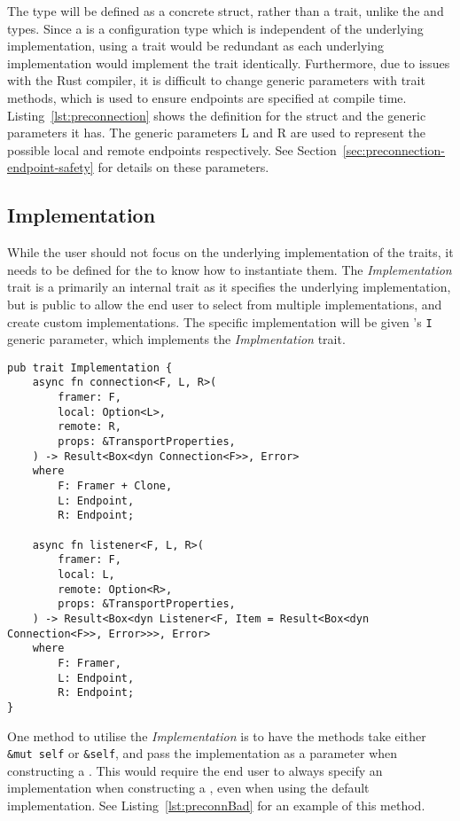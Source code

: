 The \preconnection{} type will be defined as a concrete struct, rather than a trait, unlike the \listener{} and
\connection{} types.
Since a \preconnection{} is a configuration type which is independent of the underlying implementation, using a
trait would be redundant as each underlying implementation would implement the trait identically.
Furthermore, due to issues with the Rust compiler, it is difficult to change generic parameters with trait methods,
which is used to ensure endpoints are specified at compile time.
Listing~\ref{lst:preconnection} shows the definition for the \preconnection{} struct and the generic parameters it
has.
The generic parameters L and R are used to represent the possible local and remote endpoints respectively.
See Section~\ref{sec:preconnection-endpoint-safety} for details on these parameters.

\subsection{Implementation}\label{subsec:implementation}
While the user should not focus on the underlying implementation of the traits, it needs to be defined for the
\preconnection{} to know how to instantiate them.
The \emph{Implementation} trait is a primarily an internal trait as it specifies the underlying implementation, but is
public to allow the end user to select from multiple implementations, and create custom implementations.
The specific implementation will be given \preconnection{}'s \texttt{I} generic parameter, which implements the
\emph{Implmentation} trait.

\begin{lstlisting}[float=h, label=lst:impl, caption={The Implementation trait.}]
pub trait Implementation {
    async fn connection<F, L, R>(
        framer: F,
        local: Option<L>,
        remote: R,
        props: &TransportProperties,
    ) -> Result<Box<dyn Connection<F>>, Error>
    where
        F: Framer + Clone,
        L: Endpoint,
        R: Endpoint;

    async fn listener<F, L, R>(
        framer: F,
        local: L,
        remote: Option<R>,
        props: &TransportProperties,
    ) -> Result<Box<dyn Listener<F, Item = Result<Box<dyn Connection<F>>, Error>>>, Error>
    where
        F: Framer,
        L: Endpoint,
        R: Endpoint;
}
\end{lstlisting}

One method to utilise the \emph{Implementation} is to have the methods take either \texttt{\&mut self} or
\texttt{\&self}, and pass the implementation as a parameter when constructing a \preconnection{}.
This would require the end user to always specify an implementation when constructing a \preconnection{}, even when
using the default implementation.
See Listing~\ref{lst:preconnBad} for an example of this method.

